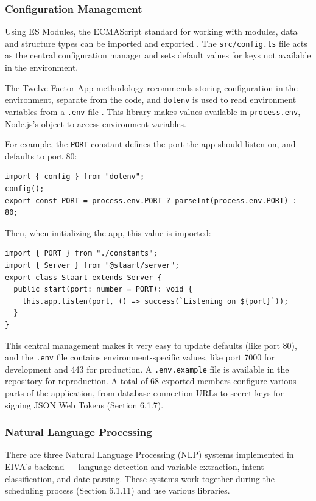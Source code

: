 \documentclass{article}
\begin{document}
\subsubsection{Configuration Management}

Using ES Modules, the ECMAScript standard for working with modules, data and structure types can be imported and exported \cite{noauthor_es_nodate}. The \texttt{src/config.ts} file acts as the central configuration manager and sets default values for keys not available in the environment.

The Twelve-Factor App methodology recommends storing configuration in the environment, separate from the code, and \texttt{dotenv} is used to read environment variables from a \texttt{.env} file \cite{noauthor_twelve-factor_nodate}. This library makes values available in \texttt{process.env}, Node.js's object to access environment variables.

For example, the \texttt{PORT} constant defines the port the app should listen on, and defaults to port 80:

\begin{verbatim}
import { config } from "dotenv";
config();
export const PORT = process.env.PORT ? parseInt(process.env.PORT) : 80;
\end{verbatim}

Then, when initializing the app, this value is imported:

\begin{verbatim}
import { PORT } from "./constants";
import { Server } from "@staart/server";
export class Staart extends Server {
  public start(port: number = PORT): void {
    this.app.listen(port, () => success(`Listening on ${port}`));
  }
}
\end{verbatim}

This central management makes it very easy to update defaults (like port 80), and the \texttt{.env} file contains environment-specific values, like port 7000 for development and 443 for production. A \texttt{.env.example} file is available in the repository for reproduction. A total of 68 exported members configure various parts of the application, from database connection URLs to secret keys for signing JSON Web Tokens (Section 6.1.7).

\subsubsection{Natural Language Processing}

There are three Natural Language Processing (NLP) systems implemented in EIVA's backend --- language detection and variable extraction, intent classification, and date parsing. These systems work together during the scheduling process (Section 6.1.11) and use various libraries.
\end{document}
